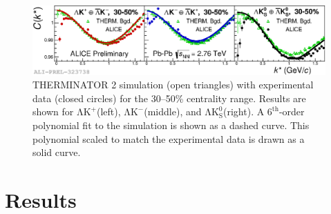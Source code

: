 \documentclass{svproc}
\newcommand{\LamKchP}{$\mathrm{\Lambda}\mathrm{K^{+}}$\xspace}
\newcommand{\LamKchM}{$\mathrm{\Lambda}\mathrm{K^{-}}$\xspace}
\newcommand{\LamKs}{$\mathrm{\Lambda}\mathrm{K^{0}_{S}}$\xspace}
\begin{document}
\begin{figure}[h]
  \centering
  \includegraphics[width=\textwidth]{./Figures/Approved/OtherFormats/EPS/2019-06-11-BgdwFitOnly_RandomEPs_NumWeight1_Full_AllAnwConj_3050.eps}
  \caption[Backgrounds with THERMINATOR 2]
  {
  THERMINATOR 2 simulation (open triangles) with experimental data (closed circles) for the 30--50\% centrality range.  
  Results are shown for \LamKchP (left), \LamKchM (middle), and \LamKs (right).
  A $6^{\mathrm{th}}$-order polynomial fit to the simulation is shown as a dashed curve.  
  This polynomial scaled to match the experimental data is drawn as a solid curve.
  }
  \label{fig:BgdswTHERM}
\end{figure} 

\section{Results}
\label{sec:Results}
\end{document}
